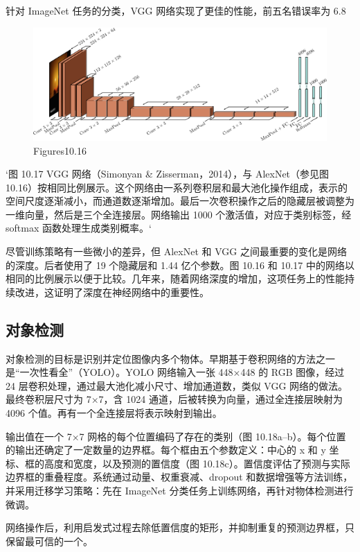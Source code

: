 针对 ImageNet 任务的分类，VGG 网络实现了更佳的性能，前五名错误率为 6.8%


\begin{figure}[h!]
\centering
\includegraphics[width=0.7\linewidth]{png/chapter10/ConvVGG.png}
\caption{Figures10.16}
\end{figure}

`图 10.17 VGG 网络（Simonyan & Zisserman，2014），与 AlexNet（参见图 10.16）按相同比例展示。这个网络由一系列卷积层和最大池化操作组成，表示的空间尺度逐渐减小，而通道数逐渐增加。最后一次卷积操作之后的隐藏层被调整为一维向量，然后是三个全连接层。网络输出 1000 个激活值，对应于类别标签，经 softmax 函数处理生成类别概率。`

尽管训练策略有一些微小的差异，但 AlexNet 和 VGG 之间最重要的变化是网络的深度。后者使用了 19 个隐藏层和 1.44 亿个参数。图 10.16 和 10.17 中的网络以相同的比例展示以便于比较。几年来，随着网络深度的增加，这项任务上的性能持续改进，这证明了深度在神经网络中的重要性。

\subsection{对象检测}
对象检测的目标是识别并定位图像内多个物体。早期基于卷积网络的方法之一是“一次性看全”（YOLO）。YOLO 网络输入一张 448×448 的 RGB 图像，经过 24 层卷积处理，通过最大池化减小尺寸、增加通道数，类似 VGG 网络的做法。最终卷积层尺寸为 7×7，含 1024 通道，后被转换为向量，通过全连接层映射为 4096 个值。再有一个全连接层将表示映射到输出。

输出值在一个 7×7 网格的每个位置编码了存在的类别（图 10.18a–b）。每个位置的输出还确定了一定数量的边界框。每个框由五个参数定义：中心的 x 和 y 坐标、框的高度和宽度，以及预测的置信度（图 10.18c）。置信度评估了预测与实际边界框的重叠程度。系统通过动量、权重衰减、dropout 和数据增强等方法训练，并采用迁移学习策略：先在 ImageNet 分类任务上训练网络，再针对物体检测进行微调。

网络操作后，利用启发式过程去除低置信度的矩形，并抑制重复的预测边界框，只保留最可信的一个。


